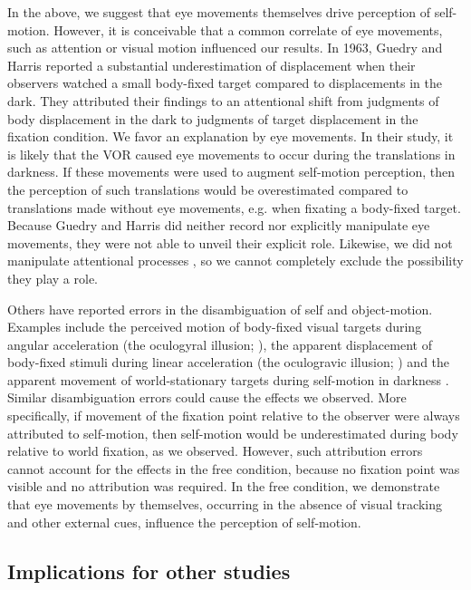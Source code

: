 In the above, we suggest that eye movements themselves drive perception of self-motion. However, it is conceivable that a common correlate of eye movements, such as attention or visual motion influenced our results. In 1963, Guedry and Harris reported a substantial underestimation of displacement when their observers watched a small body-fixed target compared to displacements in the dark. They attributed their findings to an attentional shift from judgments of body displacement in the dark to judgments of target displacement in the fixation condition. We favor an explanation by eye movements.  In their study, it is likely that the VOR caused eye movements  to occur during the translations in darkness. If these movements were used to augment self-motion perception, then the perception of such translations would be overestimated compared to translations made without eye movements, e.g. when fixating a body-fixed target. Because Guedry and Harris \citeyear{guedry1963} did neither record nor explicitly manipulate eye movements, they were not able to unveil their explicit role. Likewise, we did not manipulate attentional processes \cite{kitazaki2003}, so we cannot completely exclude the possibility they play a role.

Others have reported errors in the disambiguation of self and object-motion. Examples include the perceived motion of body-fixed visual targets during angular acceleration (the oculogyral illusion; ), the apparent displacement of body-fixed stimuli during linear acceleration (the oculogravic illusion; ) and the apparent movement of world-stationary targets during self-motion in darkness \cite{dyde2008}. Similar disambiguation errors could cause the effects we observed. More specifically, if movement of the fixation point relative to the observer were always attributed to self-motion, then self-motion would be underestimated during body relative to world fixation, as we observed. However, such attribution errors cannot account for the effects in the free condition, because no fixation point was visible and no attribution was required. In the free condition, we demonstrate that eye movements by themselves, occurring in the absence of visual tracking and other external cues, influence the perception of self-motion.

\subsection{Implications for other studies}

